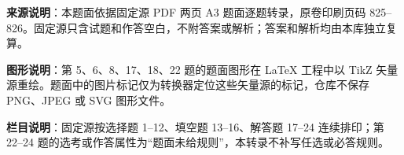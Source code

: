 


\begin{gktip}
\textbf{来源说明}：本题面依据固定源 PDF 两页 A3 题面逐题转录，原卷印刷页码 825–826。固定源只含试题和作答空白，不附答案或解析；答案和解析均由本库独立复算。

\textbf{图形说明}：第 5、6、8、17、18、22 题的题面图形在 LaTeX 工程中以 TikZ 矢量源重绘。题面中的图片标记仅为转换器定位这些矢量源的标记，仓库不保存 PNG、JPEG 或 SVG 图形文件。

\textbf{栏目说明}：固定源按选择题 1–12、填空题 13–16、解答题 17–24 连续排印；第 22–24 题的选考或作答属性为“题面未给规则”，本转录不补写任选或必答规则。
\end{gktip}


